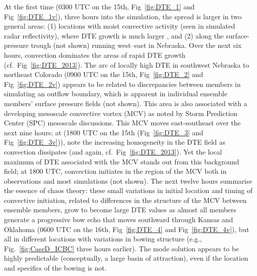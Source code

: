 \documentclass{ametsoc}
\begin{document}
At the first time (0300 UTC on the 15th, Fig~\ref{fig:DTE_1} and Fig~\ref{fig:DTE_1v}), three hours into the simulation, the spread is larger in two general areas: (1) locations with moist convective activity (seen in simulated radar reflectivity), where DTE growth is much larger \citep{Zhang2003-sa}, and (2) along the surface-pressure trough (not shown) running west--east in Nebraska. Over the next six hours, convection dominates the areas of rapid DTE growth (cf.\ Fig~\ref{fig:DTE_2013}). The arc of locally high DTE in southwest Nebraska to northeast Colorado (0900 UTC on the 15th, Fig~\ref{fig:DTE_2} and Fig~\ref{fig:DTE_2v}) appears to be related to discrepancies between members in simulating an outflow boundary, which is apparent in individual ensemble members' surface pressure fields (not shown). This area is also associated with a developing mesoscale convective vortex (MCV) as noted by Storm Prediction Center (SPC) mesoscale discussions. This MCV moves east-southeast over the next nine hours; at (1800 UTC on the 15th (Fig~\ref{fig:DTE_3} and Fig~\ref{fig:DTE_3v})), note the increasing homogeneity in the DTE field as convection dissipates (and again, cf.\ Fig~\ref{fig:DTE_2013}). Yet the local maximum of DTE associated with the MCV stands out from this background field; at 1800 UTC, convection initiates in the region of the MCV both in observations and most simulations (not shown). The next twelve hours summarise the essence of chaos theory: these small variations in initial location and timing of convective initiation, related to differences in the structure of the MCV between ensemble members, grow to become large DTE values as almost all members generate a progressive bow echo that moves southward through Kansas and Oklahoma (0600 UTC on the 16th, Fig~\ref{fig:DTE_4} and Fig~\ref{fig:DTE_4v}), but all in different locations with variations in bowing structure (e.g., Fig.~\ref{fig:CaseD_ICBC} three hours earlier). The mode solution appears to be highly predictable (conceptually, a large basin of attraction), even if the location and specifics of the bowing is not.
\end{document}
